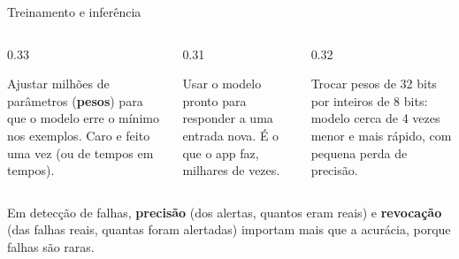 \begin{frame}{Treinamento e inferência}
  \centering
  \vspace{4pt}
  \begin{columns}[T]
    \begin{column}{0.33\textwidth}
      \begin{definicao}[Treinamento]
        Ajustar milhões de parâmetros (\textbf{pesos}) para que o modelo erre o mínimo nos exemplos. Caro e feito uma vez (ou de tempos em tempos).
      \end{definicao}
    \end{column}
    \begin{column}{0.31\textwidth}
      \begin{definicao}[Inferência]
        Usar o modelo pronto para responder a uma entrada nova. É o que o app faz, milhares de vezes.
      \end{definicao}
    \end{column}
    \begin{column}{0.32\textwidth}
      \begin{pordentro}[Quantização]
        Trocar pesos de 32 bits por inteiros de 8 bits: modelo cerca de 4 vezes menor e mais rápido, com pequena perda de precisão.
      \end{pordentro}
    \end{column}
  \end{columns}
  \begin{atencao}
    Em detecção de falhas, \textbf{precisão} (dos alertas, quantos eram reais) e \textbf{revocação} (das falhas reais, quantas foram alertadas) importam mais que a acurácia, porque falhas são raras.
  \end{atencao}
\end{frame}

